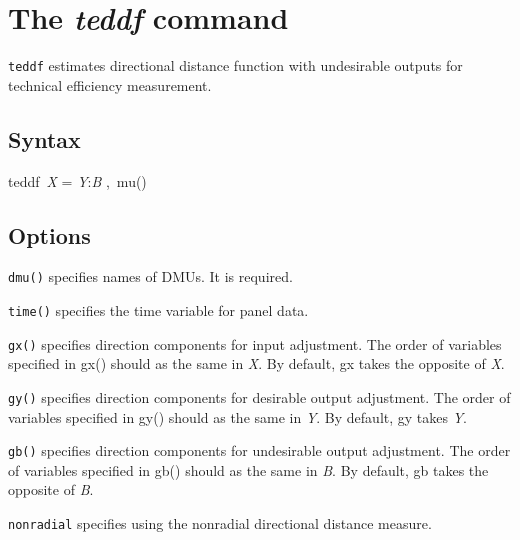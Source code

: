 
\section{The \textit{teddf} command}\label{sec_teddf}
{\tt teddf} estimates directional distance function with undesirable outputs for technical efficiency measurement.

\subsection{Syntax}
\begin{stsyntax}
	teddf\
	\textit{X\varlist} = \textit{Y\varlist}:\textit{B\varlist} \optif \optin,\
	mu(\varname)
\end{stsyntax}


\subsection{Options}

\hangpara
{\tt dmu(\varname)} specifies names of DMUs. It is required.

\hangpara
{\tt time(\varname)} specifies the time variable for panel data.

\hangpara
{\tt gx(\varlist)} specifies direction components for input adjustment. The order of variables specified in gx() should as the same in \textit{X\varlist}. By default, gx takes the opposite of \textit{X\varlist}.

\hangpara
{\tt gy(\varlist)} specifies direction components for desirable output adjustment. The order of variables specified in gy() should as the same in \textit{Y\varlist}. By default, gy takes \textit{Y\varlist}.

\hangpara
{\tt gb(\varlist)} specifies direction components for undesirable output adjustment. The order of variables specified in gb() should as the same in \textit{B\varlist}. By default, gb takes the opposite of \textit{B\varlist}.

\hangpara
{\tt nonradial} specifies using the nonradial directional distance measure.

